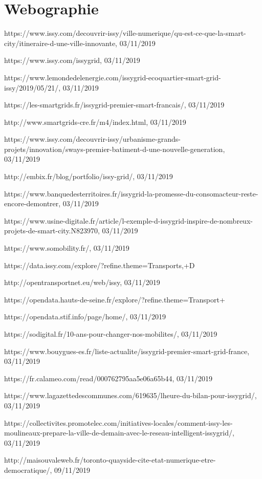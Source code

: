 \chapter*{Webographie}

https://www.issy.com/decouvrir-issy/ville-numerique/qu-est-ce-que-la-smart-city/itineraire-d-une-ville-innovante, 03/11/2019

https://www.issy.com/issygrid, 03/11/2019

https://www.lemondedelenergie.com/issygrid-ecoquartier-smart-grid-issy/2019/05/21/, 03/11/2019

https://les-smartgrids.fr/issygrid-premier-smart-francais/, 03/11/2019

http://www.smartgrids-cre.fr/m4/index.html, 03/11/2019

https://www.issy.com/decouvrir-issy/urbanisme-grands-projets/innovation/sways-premier-batiment-d-une-nouvelle-generation, 03/11/2019

http://embix.fr/blog/portfolio/issy-grid/, 03/11/2019

https://www.banquedesterritoires.fr/issygrid-la-promesse-du-consomacteur-reste-encore-demontrer, 03/11/2019

https://www.usine-digitale.fr/article/l-exemple-d-issygrid-inspire-de-nombreux-projets-de-smart-city.N823970, 03/11/2019

https://www.somobility.fr/, 03/11/2019

https://data.issy.com/explore/?refine.theme=Transports,+D%

http://opentransportnet.eu/web/issy, 03/11/2019

https://opendata.hauts-de-seine.fr/explore/?refine.theme=Transport+%

https://opendata.stif.info/page/home/, 03/11/2019

https://sodigital.fr/10-ans-pour-changer-nos-mobilites/, 03/11/2019

https://www.bouygues-es.fr/liste-actualite/issygrid-premier-smart-grid-france, 03/11/2019

https://fr.calameo.com/read/000762795aa5e06a65b44, 03/11/2019

https://www.lagazettedescommunes.com/619635/lheure-du-bilan-pour-issygrid/, 03/11/2019

https://collectivites.promotelec.com/initiatives-locales/comment-issy-les-moulineaux-prepare-la-ville-de-demain-avec-le-reseau-intelligent-issygrid/, 03/11/2019

http://maisouvaleweb.fr/toronto-quayside-cite-etat-numerique-etre-democratique/, 09/11/2019
